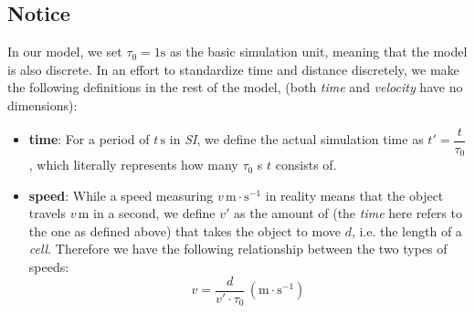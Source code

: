 \documentclass{article}
\begin{document}
	\subsection{Notice}
	In our model, we set \(\tau_0=1\mathrm{s}\) as the basic simulation unit, meaning that the model is also discrete. In an effort to standardize time and distance discretely, we make the following definitions in the rest of the model, (both \textit{time} and \textit{velocity} have no dimensions):
	\begin{itemize}
		\item \textbf{time}:
			For a period of \(t\,\mathrm{s}\) in \textit{SI}, we define the actual simulation time as \(t'=\dfrac{t}{\tau_0}\), which literally represents how many \(\tau_0\) s \(t\) consists of.
		\item \textbf{speed}:
			While a speed measuring \(v\,\mathrm{m\cdot s^{-1}}\) in reality means that the object travels \(v\,\mathrm{m}\) in a second, we define  \(v'\) as the amount of  (the \textit{time} here refers to the one as defined above) that takes the object to move \(d\), i.e. the length of a \textit{cell}. Therefore we have the following relationship between the two types of speeds:\[v=\dfrac{d}{v'\cdot \tau_0}\,\left(\mathrm{m\cdot s^{-1}}\right)\]
	\end{itemize}
\end{document}
